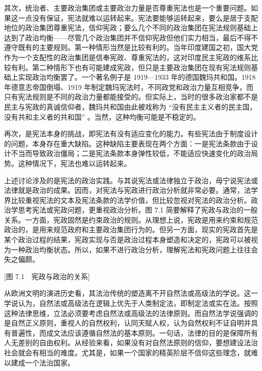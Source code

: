 其次，统治者、主要政治集团或主要政治力量是否尊重宪法也是一个重要问题。如果这一点没有保证，宪法就难以运转起来。宪法要能够运转起来，要么是居于支配地位的政治集团尊重宪法，信仰宪政；要么几个不同的政治集团在宪法规则基础上达到了政治均衡——尽管几个政治集团并不信仰宪政但他们实力相当，最后不得不遵守既有的主要规则。第一种情形当然是比较有利的。当年印度建国之初，国大党作为一个支配性的政治集团是信奉宪政、尊重宪法的，这对印度民主宪政的维系比较有利。第二种情形下也有可能建成宪政，但只是主要政治集团在现有宪法规则基础上实现政治均衡罢了。一个著名例子是 1919—1933 年的德国魏玛共和国。1918 年德意志帝国倒塌、1919 年制定魏玛宪法时，不同政党和政治力量互相竞争，而只有宪法规则是不同的政治力量都能接受的。但实际上，当时的很多政治家都不是民主与宪政的真诚信仰者，魏玛共和国由此被戏称为 “没有民主主义者的民主国，没有共和主义者的共和国” 。当然，这种均衡可能是不稳定的。

再次，是宪法本身的挑战，即宪法有没有适应变化的能力。有些宪法由于制度设计的问题，本身存在重大缺陷。这种缺陷主要表现在两个方面：一是宪法条款由于设计不当而导致政治僵局；二是宪法条款本身弹性较低，不能适应快速变化的政治局势。这种情况下，宪法也难以运转起来。

上述讨论涉及的是宪法的政治实践。与其说宪法或法律独立于政治，毋宁说宪法或法律就是政治的成果。因而，对宪法与宪政进行政治分析就非常必要。通常，法学界比较重视宪法的文本及宪法条款的法学价值，但比较忽视对宪法的政治分析。政治学思考宪法或宪政问题，更重视政治分析。图 7.1 简要解释了宪政与政治的一般关系。一方面，宪政固然是约束政治的规则。从理想上说，宪政是用来约束和规范政治的，是用来规范政府和主要政治集团行为的。但另一方面，现实的宪政首先是某个政治过程的结果，宪政实现与否是政治过程本身塑造和决定的，宪政可以被视为一种政治均衡状态。所以，如果不进行政治分析，理解宪法和宪政问题上往往会失之偏颇。

[图 7.1　宪政与政治的关系]


从欧洲文明的演进历史看，其法治传统的塑造离不开自然法或高级法的学说。这一学说认为，自然法或高级法在逻辑上优先于人类制定法，即制定法或实在法。按照这种法律思维，立法必须要考虑自然法或高级法的法律原则。而自然法学说强调的是自然正义原则，重视人的自然权利，认同天赋人权，认为自然权利不证自明并具有普遍性，而成文法应该遵循自然法的基本原则。一句话，法律的目的是保障所有人无差别的自由权利。从经验来看，如果没有对自然法原则的信仰，要想建设法治社会就会有相当的难度。尤其是，如果一个国家的精英阶层不信仰这些理念，就难以建成一个法治国家。

